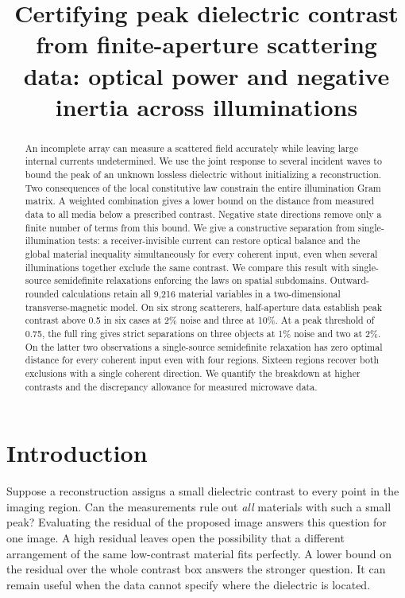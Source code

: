 \documentclass[anonymous,12pt]{iopjournal}
\theoremstyle{remark}\newtheorem{remark}[theorem]{Remark}
\numberwithin{equation}{section}
\begin{document}
\par\vspace{1.8ex}
\title{Certifying peak dielectric contrast from finite-aperture scattering data: optical power and negative inertia across illuminations}
\author{}
\begin{abstract}
An incomplete array can measure a scattered field accurately while leaving large internal currents undetermined. We use the joint response to several incident waves to bound the peak of an unknown lossless dielectric without initializing a reconstruction. Two consequences of the local constitutive law constrain the entire illumination Gram matrix. A weighted combination gives a lower bound on the distance from measured data to all media below a prescribed contrast. Negative state directions remove only a finite number of terms from this bound. We give a constructive separation from single-illumination tests: a receiver-invisible current can restore optical balance and the global material inequality simultaneously for every coherent input, even when several illuminations together exclude the same contrast. We compare this result with single-source semidefinite relaxations enforcing the laws on spatial subdomains. Outward-rounded calculations retain all 9,216 material variables in a two-dimensional transverse-magnetic model. On six strong scatterers, half-aperture data establish peak contrast above 0.5 in six cases at 2\% noise and three at 10\%. At a peak threshold of 0.75, the full ring gives strict separations on three objects at 1\% noise and two at 2\%. On the latter two observations a single-source semidefinite relaxation has zero optimal distance for every coherent input even with four regions. Sixteen regions recover both exclusions with a single coherent direction. We quantify the breakdown at higher contrasts and the discrepancy allowance for measured microwave data.
\end{abstract}

\section{Introduction}\label{sec:intro}

Suppose a reconstruction assigns a small dielectric contrast to every point in the imaging region. Can the measurements rule out \emph{all} materials with such a small peak? Evaluating the residual of the proposed image answers this question for one image. A high residual leaves open the possibility that a different arrangement of the same low-contrast material fits perfectly. A lower bound on the residual over the whole contrast box answers the stronger question. It can remain useful when the data cannot specify where the dielectric is located.
\end{document}
